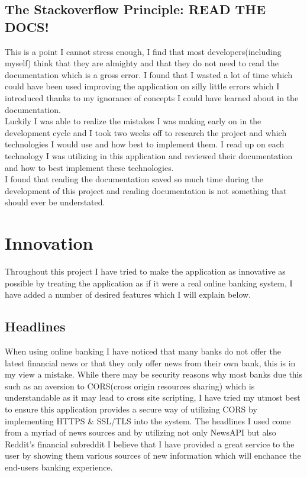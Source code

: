 \subsection{The Stackoverflow Principle: READ THE DOCS!}
This is a point I cannot stress enough,  I find that most developers(including myself) think that they are almighty and that they do not need to read the documentation which is a gross error.  I found that I wasted a lot of time which could have been used improving the application on silly little errors which I introduced thanks to my ignorance of concepts I could have learned about in the documentation.
\\
Luckily I was able to realize the mistakes I was making early on in the development cycle and I took two weeks off to research the project and which technologies I would use and how best to implement them.  I read up on each technology I was utilizing in this application and reviewed their documentation and how to best implement these technologies.
\\
I found that reading the documentation saved so much time during the development of this project and reading documentation is not something that should ever be understated.
\section{Innovation}
Throughout this project I have tried to make the application as innovative as possible by treating the application as if it were a real online banking system, I have added a number of desired features which I will explain below.
\subsection{Headlines}
When using online banking I have noticed that many banks do not offer the latest financial news or that they only offer news from their own bank, this is in my view a mistake.  While there may be security reasons why most banks due this such as an aversion to CORS(cross origin resources sharing) which is understandable as it may lead to cross site scripting,  I have tried my utmost best to ensure this application provides a secure way of utilizing CORS by implementing HTTPS \& SSL/TLS into the system.  The headlines I used come from a myriad of news sources and by utilizing not only NewsAPI but also Reddit's financial subreddit I believe that I have provided a great service to the user by showing them various sources of new information which will enchance the end-users banking experience.
